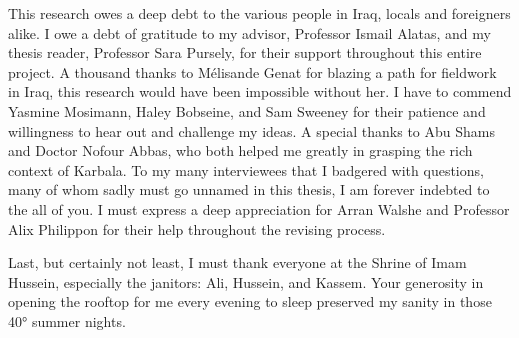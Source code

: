 This research owes a deep debt to the various people in Iraq, locals and foreigners alike. I owe a debt of gratitude to my advisor, Professor Ismail Alatas, and my thesis reader, Professor Sara Pursely, for their support throughout this entire project.
A thousand thanks to Mélisande Genat for blazing a path for fieldwork in Iraq, this research would have been impossible without her. I have to commend Yasmine Mosimann, Haley Bobseine, and Sam Sweeney for their patience and willingness to hear out and challenge my ideas. A special thanks to Abu Shams and Doctor Nofour Abbas, who both helped me greatly in grasping the rich context of Karbala. To my many interviewees that I badgered with questions, many of whom sadly must go unnamed in this thesis, I am forever indebted to the all of you. I must express a deep appreciation for Arran Walshe and Professor Alix Philippon for their help throughout the revising process.

Last, but certainly not least, I must thank everyone at the Shrine of Imam Hussein, especially the janitors: Ali, Hussein, and Kassem. Your generosity in opening the rooftop for me every evening to sleep preserved my sanity in those 40° summer nights. 